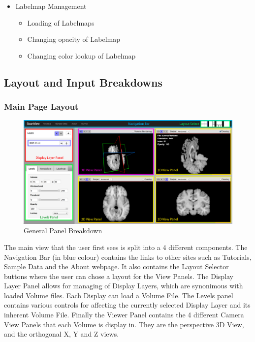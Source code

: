 \documentclass[a4paper,11pt,titlepage]{article}
\begin{document}
\begin{itemize}
\item Labelmap Management

  \begin{itemize}
  \item Loading of Labelmaps
  \item Changing opacity of Labelmap
  \item Changing color lookup of Labelmap
  \end{itemize}

\end{itemize}


\subsection{Layout and Input Breakdowns}

\subsubsection{Main Page Layout}

\begin{figure}[ht!]
\centering
\includegraphics[width=170mm]{graphics/features_01.png}
\caption{General Panel Breakdown}
\label{fig:UIdesign1}
\end{figure}

The main view that the user first sees is split into a 4 different components. The Navigation Bar (in blue colour) contains the links to other sites such as Tutorials, Sample Data and the About webpage. It also contains the Layout Selector buttons where the user can chose a layout for the View Panels. The Display Layer Panel allows for managing of Display Layers, which are synonimous with loaded Volume files. Each Display can load a Volume File. The Levels panel contains various controls for affecting the currently selected Display Layer and its inherent Volume File. Finally the Viewer Panel contains the 4 different Camera View Panels that each Volume is display in. They are the perspective 3D View, and the orthogonal X, Y and Z views.
\end{document}
